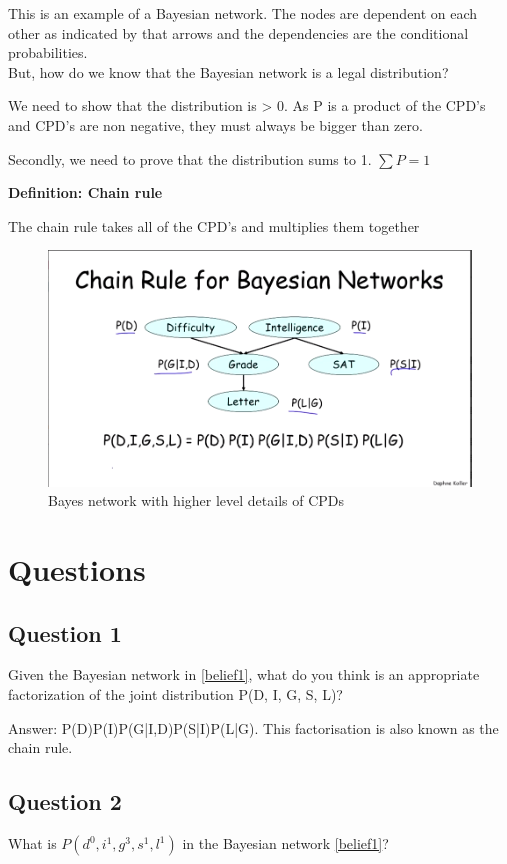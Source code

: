 \documentclass[11pt]{report}
\newcommand{\define}[2] {
  \textbf{Definition: #1}
  \begin{center} #2
\end{center}
}
\begin{document}
This is an example of a Bayesian network. The nodes are dependent on each other as indicated by that arrows and the dependencies are the conditional probabilities. \\

But, how do we know that the Bayesian network is a legal distribution?

We need to show that the distribution is > 0. As P is a product of the CPD's and CPD's are non negative, they must always be bigger than zero.

Secondly, we need to prove that the distribution sums to 1. $\sum{P = 1}$

\define{Chain rule}{The chain rule takes all of the CPD's and multiplies them together}

\begin{figure}[H]
\centering
\includegraphics[scale=0.5]{images/cpd_chainrule.png}
\caption{Bayes network with higher level details of CPDs}
\label{sensorymockup2}
\end{figure}

\section{Questions}

\subsection{Question 1}
Given the Bayesian network in \ref{belief1}, what do you think is an appropriate factorization of the joint distribution P(D, I, G, S, L)?

Answer: P(D)P(I)P(G|I,D)P(S|I)P(L|G). This factorisation is also known as the chain rule. 

\subsection*{Question 2}
What is $P(d^0, i^1, g^3, s^1, l^1)$ in the Bayesian network \ref{belief1}?
\end{document}

